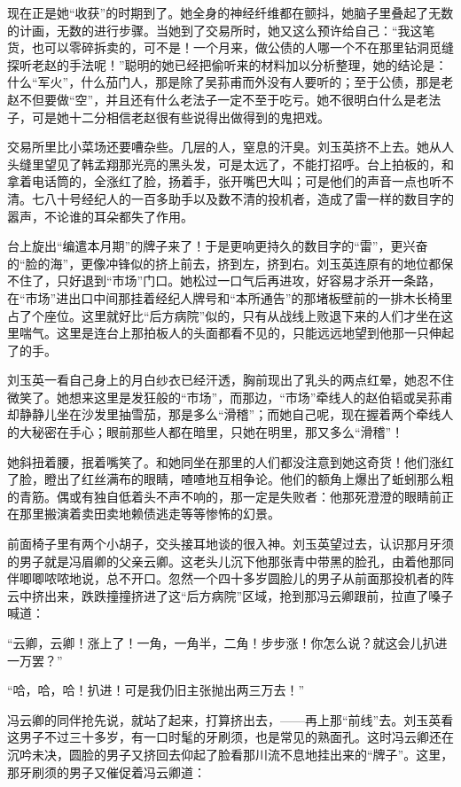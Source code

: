 \par 现在正是她“收获”的时期到了。她全身的神经纤维都在颤抖，她脑子里叠起了无数的计画，无数的进行步骤。当她到了交易所时，她又这么预许给自己：“我这笔货，也可以零碎拆卖的，可不是！一个月来，做公债的人哪一个不在那里钻洞觅缝探听老赵的手法呢！”聪明的她已经把偷听来的材料加以分析整理，她的结论是：什么“军火”，什么茄门人，那是除了吴荪甫而外没有人要听的；至于公债，那是老赵不但要做“空”，并且还有什么老法子一定不至于吃亏。她不很明白什么是老法子，可是她十二分相信老赵很有些说得出做得到的鬼把戏。
\par 交易所里比小菜场还要嘈杂些。几层的人，窒息的汗臭。刘玉英挤不上去。她从人头缝里望见了韩孟翔那光亮的黑头发，可是太远了，不能打招呼。台上拍板的，和拿着电话筒的，全涨红了脸，扬着手，张开嘴巴大叫；可是他们的声音一点也听不清。七八十号经纪人的一百多助手以及数不清的投机者，造成了雷一样的数目字的嚣声，不论谁的耳朵都失了作用。
\par 台上旋出“编遣本月期”的牌子来了！于是更响更持久的数目字的“雷”，更兴奋的“脸的海”，更像冲锋似的挤上前去，挤到左，挤到右。刘玉英连原有的地位都保不住了，只好退到“市场”门口。她松过一口气后再进攻，好容易才杀开一条路，在“市场”进出口中间那挂着经纪人牌号和“本所通告”的那堵板壁前的一排木长椅里占了个座位。这里就好比“后方病院”似的，只有从战线上败退下来的人们才坐在这里喘气。这里是连台上那拍板人的头面都看不见的，只能远远地望到他那一只伸起了的手。
\par 刘玉英一看自己身上的月白纱衣已经汗透，胸前现出了乳头的两点红晕，她忍不住微笑了。她想来这里是发狂般的“市场”，而那边，“市场”牵线人的赵伯韬或吴荪甫却静静儿坐在沙发里抽雪茄，那是多么“滑稽”；而她自己呢，现在握着两个牵线人的大秘密在手心；眼前那些人都在暗里，只她在明里，那又多么“滑稽”！
\par 她斜扭着腰，抿着嘴笑了。和她同坐在那里的人们都没注意到她这奇货！他们涨红了脸，瞪出了红丝满布的眼睛，喳喳地互相争论。他们的额角上爆出了蚯蚓那么粗的青筋。偶或有独自低着头不声不响的，那一定是失败者：他那死澄澄的眼睛前正在那里搬演着卖田卖地赖债逃走等等惨怖的幻景。
\par 前面椅子里有两个小胡子，交头接耳地谈的很入神。刘玉英望过去，认识那月牙须的男子就是冯眉卿的父亲云卿。这老头儿沉下他那张青中带黑的脸孔，由着他那同伴唧唧哝哝地说，总不开口。忽然一个四十多岁圆脸儿的男子从前面那投机者的阵云中挤出来，跌跌撞撞挤进了这“后方病院”区域，抢到那冯云卿跟前，拉直了嗓子喊道：
\par “云卿，云卿！涨上了！一角，一角半，二角！步步涨！你怎么说？就这会儿扒进一万罢？”
\par “哈，哈，哈！扒进！可是我仍旧主张抛出两三万去！”
\par 冯云卿的同伴抢先说，就站了起来，打算挤出去，——再上那“前线”去。刘玉英看这男子不过三十多岁，有一口时髦的牙刷须，也是常见的熟面孔。这时冯云卿还在沉吟未决，圆脸的男子又挤回去仰起了脸看那川流不息地挂出来的“牌子”。这里，那牙刷须的男子又催促着冯云卿道：
